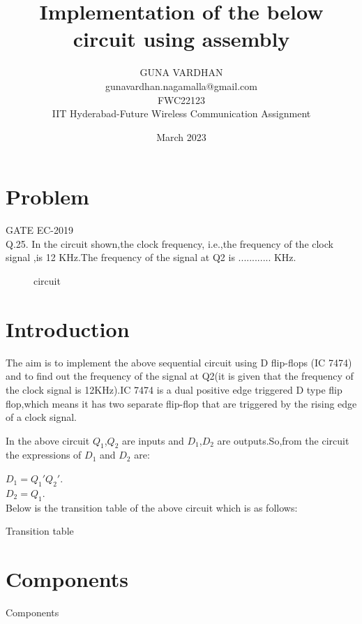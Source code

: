 \documentclass{article}
\title{Implementation of the below circuit using assembly}
\date{March 2023}
\author{GUNA VARDHAN\\gunavardhan.nagamalla@gmail.com\\FWC22123\\IIT Hyderabad-Future Wireless Communication Assignment}
\begin{document}
\maketitle
	\tableofcontents

\pagebreak

\section{Problem}
	{GATE EC-2019}\\
	Q.25. In the circuit shown,the clock frequency, i.e.,the frequency of the clock signal ,is 12 KHz.The frequency of the signal at Q2 is ............ KHz.
	\begin{figure}[h]
	\centering
		
		\caption{circuit}
		\label{fig:1}
	\end{figure}

\section{Introduction}
		
		The aim is to implement the above sequential circuit using D flip-flops (IC 7474) and to find out the frequency of the signal at Q2(it is given that the frequency of the clock signal is 12KHz).IC 7474 is a dual positive edge triggered D type flip flop,which means it has two separate flip-flop that are triggered by the rising edge of a clock signal.

		In the above circuit $Q_1$,$Q_2$ are inputs and $D_1$,$D_2$ are outputs.So,from the circuit the expressions of $D_1$ and $D_2$ are:

		$D_1 = Q_1'Q_2'$.\\
			$D_2 = Q_1$.\\

Below is the transition table of the above circuit which is as follows:
\pagebreak

	\begin{table}[h]
		\begin{center}
			
			\caption{Transition table}
			\label{table:2}
		\end{center}
	\end{table}

\section{Components}
	
	\begin{table}[h]
		\begin{center}
			
			\caption{Components}
			\label{table:1}
		\end{center}
	\end{table}
\end{document}
